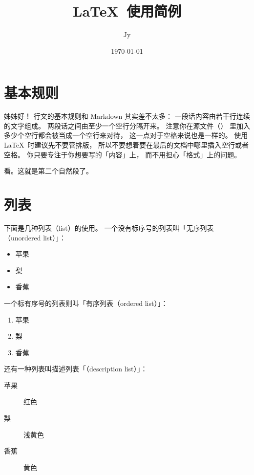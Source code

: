 \documentclass{article}
\title{\LaTeX\ 使用简例}
\author{Jy}
\date{\today}
\begin{document}
\maketitle %


\section{基本规则}

姊姊好！
行文的基本规则和 Markdown 其实差不太多：
一段话内容由若干行连续的文字组成。
两段话之间由至少一个空行分隔开来。
注意你在源文件（）
里加入多少个空行都会被当成一个空行来对待，
这一点对于空格来说也是一样的。
使用 \LaTeX\ 时建议先不要管排版，
所以不要想着要在最后的文档中哪里插入空行或者空格。
你只要专注于你想要写的「内容」上，
而不用担心「格式」上的问题。

看。这就是第二个自然段了。


\section{列表}

下面是几种列表（list）的使用。
一个没有标序号的列表叫「无序列表（unordered list）」：
\begin{itemize}
\item 
    苹果
\item 
    梨
\item 
    香蕉
\end{itemize}
一个标有序号的列表则叫「有序列表（ordered list）」：
\begin{enumerate}
\item 
    苹果
\item 
    梨
\item 
    香蕉
\end{enumerate}
还有一种列表叫描述列表「（description list）」：
\begin{description}
\item[苹果]
    红色
\item[梨]
    浅黄色
\item[香蕉]
    黄色
\end{description}
\end{document}
